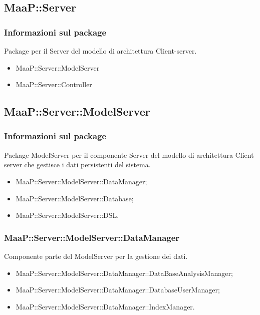 \subsection{MaaP::Server}
\subsubsection{Informazioni sul package}
Package per il  Server del modello di architettura Client-server.
\begin{itemize}
\item MaaP::Server::ModelServer
\item MaaP::Server::Controller
\end{itemize}

\subsection{MaaP::Server::ModelServer}
\subsubsection{Informazioni sul package}
Package ModelServer per il componente Server del modello di architettura Client-server che gestisce i dati persistenti del sistema.

\begin{itemize}
\item MaaP::Server::ModelServer::DataManager;
\item MaaP::Server::ModelServer::Database;
\item MaaP::Server::ModelServer::DSL.
\end{itemize}

\subsubsection{MaaP::Server::ModelServer::DataManager}
Componente parte del ModelServer per la gestione dei dati.
\begin{itemize}
\item MaaP::Server::ModelServer::DataManager::DataBaseAnalysisManager;
\item MaaP::Server::ModelServer::DataManager::DatabaseUserManager;
\item MaaP::Server::ModelServer::DataManager::IndexManager.
\end{itemize}

